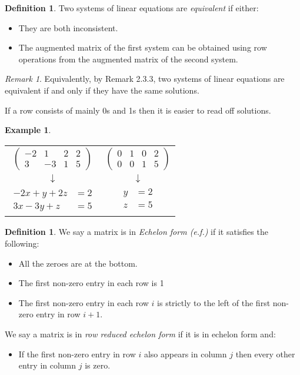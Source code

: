 \documentclass{report}
\theoremstyle{remark}
\newtheorem{remark}[theorem]{Remark}
\theoremstyle{definition}
\newtheorem{definition}[theorem]{Definition}
\theoremstyle{definition}
\newtheorem{example}[theorem]{Example}
\theoremstyle{theorem}
\begin{document}
\begin{definition}Two systems of linear equations are \emph{equivalent} if either:
\begin{itemize}
\item They are both inconsistent.
\item The augmented matrix of the first system can be obtained using row operations from the augmented matrix of the second system.
\end{itemize}
\end{definition}
\begin{remark} Equivalently, by Remark 2.3.3, two systems of linear equations are equivalent if and only if they have the same solutions.
\end{remark}
If a row consists of mainly 0s and 1s then it is easier to read off solutions.
\begin{example}
\begin{tabular}{cc}
$\left( \begin{array}{ccc|c}
-2&1&2&2\\
3&-3&1&5
\end{array} \right)$ & $ \left( \begin{array}{ccc|c}
0&1&0&2\\
0&0&1&5
\end{array} \right) $\\
$\downarrow$ &$ \downarrow$ \\
$ \begin{aligned}
-2x + y + 2z &= 2\\
3x - 3y + z &= 5
\end{aligned}$ & $ \begin{aligned}
y &=2\\
z &= 5\\
\end{aligned}$
\end{tabular}
\end{example}
\begin{definition}
We say a matrix is in \emph{Echelon form (e.f.)} if it satisfies the following:
\begin{itemize}
\item All the zeroes are at the bottom.
\item The first non-zero entry in each row is 1
\item The first non-zero entry in each row $i$ is strictly to the left of the first non-zero entry in row $i+1$.
\end{itemize}
We say a matrix is in \emph{row reduced echelon form} if it is in echelon form and:
\begin{itemize}
\item If the first non-zero entry in row $i$ also appears in column $j$ then every other entry in column $j$ is zero.
\end{itemize}
\end{definition}
\end{document}
